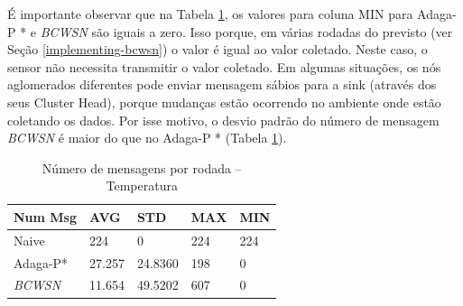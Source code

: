\documentclass{acm_proc_article-sp}
\begin{document}
É importante observar que na Tabela \ref{tab:num-msg}, os valores para coluna
MIN para Adaga-P * e {\it BCWSN} são iguais a zero. Isso porque, em várias rodadas
do previsto (ver Seção \ref{implementing-bcwsn}) o valor é igual ao valor
coletado. Neste caso, o sensor não necessita transmitir o valor coletado.
Em algumas situações, os nós aglomerados diferentes pode enviar mensagem 
sábios para a sink (através dos seus Cluster Head), porque mudanças
estão ocorrendo no ambiente onde estão coletando os dados. Por isse motivo,
o desvio padrão do número de mensagem {\it BCWSN} é maior do que no Adaga-P * 
(Tabela \ref{tab:num-msg}).
\vspace*{-.3cm}

\begin{table}[h!]
\small
\caption{Número de mensagens por rodada – Temperatura}
\label{tab:num-msg}
\begin{center}
\begin{tabular}{|l||l|l|l|l|}
\hline
Num Msg &AVG &STD &MAX &MIN \\
\hline\hline
Naive &224 &0 &224 &224 \\
\hline
Adaga-P* &27.257 &24.8360 &198 &0 \\
\hline
{\it BCWSN} &11.654 &49.5202 &607 &0 \\
\hline
\end{tabular}
\end{center}
\end{table}
\vspace*{-.3cm}
\end{document}
